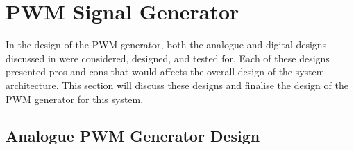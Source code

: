 



%
%

\section{PWM Signal Generator}\label{S:pwm_gen_design}

In the design of the PWM generator, both the analogue and digital designs discussed in  were considered, designed, and tested for. Each of these designs presented pros and cons that would affects the overall design of the system architecture. This section will discuss these designs and finalise the design of the PWM generator for this system. 

\subsection{Analogue PWM Generator Design}\label{S:PWM_analogue_design}

